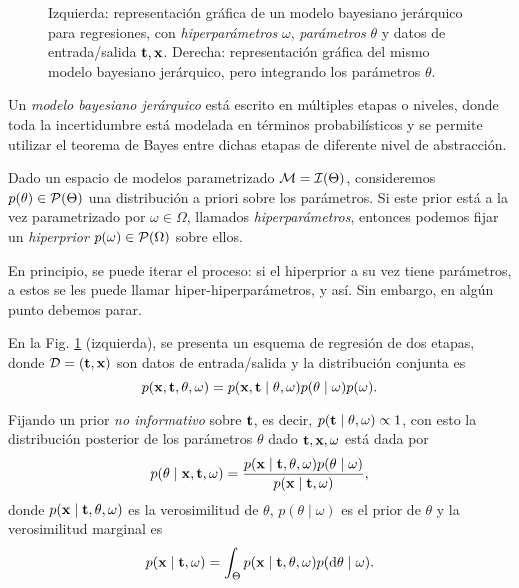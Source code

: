 \begin{figure}[h]
	\centering
	\hspace{5em}
	\caption{Izquierda: representación gráfica de un modelo bayesiano jerárquico para regresiones, con \emph{hiperparámetros} \(\omega\), \emph{parámetros} \(\theta\) y datos de entrada/salida \(\mathbf{t}, \mathbf{x}\). Derecha: representación gráfica del mismo modelo bayesiano jerárquico, pero integrando los parámetros \(\theta\).}
	\label{fig:hierarchical_model}
\end{figure}

Un \emph{modelo bayesiano jerárquico} está escrito en múltiples etapas o niveles, donde toda la incertidumbre está modelada en términos probabilísticos y se permite utilizar el teorema de Bayes entre dichas etapas de diferente nivel de abstracción. 

Dado un espacio de modelos parametrizado \(\mathcal{M} = \mathcal{I}(\Theta)\), consideremos \(p(\theta) \in \mathcal{P}(\Theta)\) una distribución a priori sobre los parámetros. Si este prior está a la vez parametrizado por \(\omega \in \Omega\), llamados \emph{hiperparámetros}, entonces podemos fijar un \emph{hiperprior} \(p(\omega) \in \mathcal{P}(\Omega)\) sobre ellos. 

En principio, se puede iterar el proceso: si el hiperprior a su vez tiene parámetros, a estos se les puede llamar hiper-hiperparámetros, y así. Sin embargo, en algún punto debemos parar. 

En la Fig. \ref{fig:hierarchical_model} (izquierda), se presenta un esquema de regresión de dos etapas, donde \(\mathcal{D} = (\mathbf{t}, \mathbf{x})\) son datos de entrada/salida y la distribución conjunta es \[p(\mathbf{x}, \mathbf{t}, \theta, \omega) = p(\mathbf{x}, \mathbf{t} \mid \theta, \omega) p(\theta \mid \omega) p(\omega).\]

Fijando un prior \emph{no informativo} sobre \(\mathbf{t}\), es decir, \(p(\mathbf{t} \mid \theta, \omega) \propto 1\), con esto la distribución posterior de los parámetros \(\theta\) dado \(\mathbf{t},\mathbf{x},\omega\) está dada por
\begin{equation*}
	p(\theta \mid \mathbf{x}, \mathbf{t}, \omega) = \frac{p(\mathbf{x} \mid \mathbf{t}, \theta, \omega) p(\theta \mid \omega)}{p(\mathbf{x} \mid \mathbf{t}, \omega)},
\end{equation*}
donde \(p(\mathbf{x} \mid \mathbf{t}, \theta, \omega) \) es la verosimilitud de \(\theta\), \(p(\theta \mid \omega)\) es el prior de \(\theta\) y la verosimilitud marginal es
\begin{equation*}
	p(\mathbf{x} \mid \mathbf{t}, \omega) = \int_{\Theta} p(\mathbf{x} \mid \mathbf{t}, \theta, \omega) p(\dd{\theta \mid \omega}).
\end{equation*}

